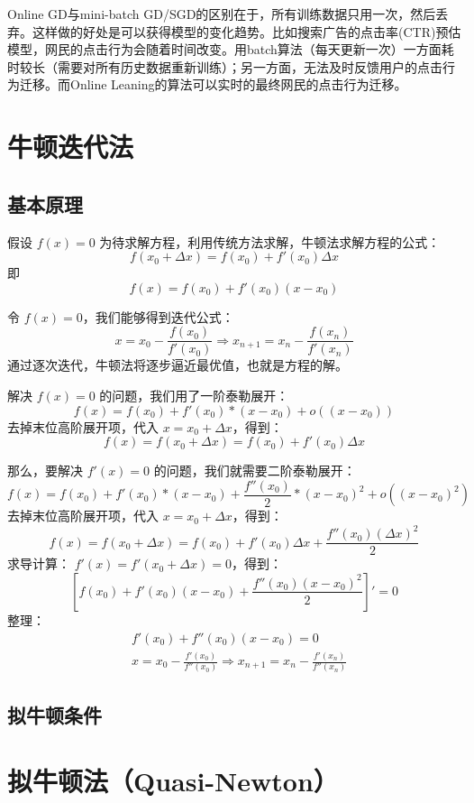\documentclass[a4paper,10pt]{ctexbook}
\begin{document}
Online GD与mini-batch GD/SGD的区别在于，所有训练数据只用一次，然后丢弃。这样做的好处是可以获得模型的变化趋势。比如搜索广告的点击率(CTR)预估模型，网民的点击行为会随着时间改变。用batch算法（每天更新一次）一方面耗时较长（需要对所有历史数据重新训练）；另一方面，无法及时反馈用户的点击行为迁移。而Online Leaning的算法可以实时的最终网民的点击行为迁移。





\section{牛顿迭代法}
\subsection{基本原理}
假设 $f(x) = 0$ 为待求解方程，利用传统方法求解，牛顿法求解方程的公式：
\[
f(x_0 + \Delta x) = f(x_0) + f'(x_0)\Delta x
\]
即
\[
    f(x) = f(x_0) + f'(x_0)(x - x_0)
\]

令 $f(x) = 0$，我们能够得到迭代公式：
\[
    x = x_0 - \frac{f(x_0)}{f'(x_0)} \Rightarrow x_{n+1} = x_n - \frac{f(x_n)}{f'(x_n)}
\]
通过逐次迭代，牛顿法将逐步逼近最优值，也就是方程的解。

解决 $f(x) = 0$ 的问题，我们用了一阶泰勒展开：
\[
    f(x) = f(x_0) + f'(x_0)*(x-x_0) + o((x-x_0))
\]
去掉末位高阶展开项，代入 $x = x_0 + \Delta x$，得到：
\[
    f(x) = f(x_0 + \Delta x) = f(x_0) + f'(x_0)\Delta x
\]


那么，要解决 $f'(x) = 0$ 的问题，我们就需要二阶泰勒展开：
\[
    f(x) = f(x_0) + f'(x_0)*(x-x_0) + \frac{f''(x_0)}{2}*(x-x_0)^2 + o((x-x_0)^2)
\]
去掉末位高阶展开项，代入 $x = x_0+\Delta x$，得到：
\[
    f(x) = f(x_0+\Delta x) = f(x_0) + f'(x_0) \Delta x + \frac{f''(x_0) (\Delta x)^2}{2}
\]
求导计算： $f'(x) = f'(x_0+\Delta x) = 0$，得到：
\[
    [f(x_0) + f'(x_0)(x−x_0) + \frac{f''(x_0)(x−x_0)^2}{2}]′ = 0
\]
整理：
\begin{align*}
    & f'(x_0) + f''(x_0)(x−x_0) = 0 \\
    & x = x_0 − \frac{f'(x_0)}{f''(x_0)} \Rightarrow  x_{n+1} = x_n - \frac{f'(x_n)}{f''(x_n)}
\end{align*}

\subsection{拟牛顿条件}

\section{拟牛顿法（Quasi-Newton）}
\end{document}
